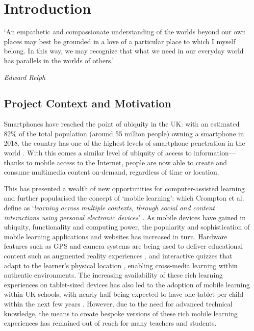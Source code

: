 \chapter{Introduction}

\epigraph{`An empathetic and compassionate understanding of the worlds beyond our own places may best be grounded in a love of a particular place to which I myself belong. In this way, we may recognize that what we need in our everyday world has parallels in the worlds of others.'}{\textit{Edward Relph}}

\section{Project Context and Motivation}

Smartphones have reached the point of ubiquity in the UK: with an estimated 82\% of the total population (around 55 million people) owning a smartphone in 2018, the country has one of the highest levels of smartphone penetration in the world \citep{wikipedia2020}. With this comes a similar level of ubiquity of access to information---thanks to mobile access to the Internet, people are now able to create and consume multimedia content on-demand, regardless of time or location.

This has presented a wealth of new opportunities for computer-assisted learning and further popularised the concept of `mobile learning': which Crompton et al. define as `\textit{learning across multiple contexts, through social and content interactions using personal electronic devices}' \citep{Crompton2013}. As mobile devices have gained in ubiquity, functionality and computing power, the popularity and sophistication of mobile learning applications and websites has increased in turn. Hardware features such as GPS and camera systems are being used to deliver educational content such as augmented reality experiences \citep{google2020}, and interactive quizzes that adapt to the learner's physical location \citep{Giemza2013}, enabling cross-media learning within authentic environments. The increasing availability of these rich learning experiences on tablet-sized devices has also led to the adoption of mobile learning within UK schools, with nearly half being expected to have one tablet per child within the next few years \citep{BritishEducationalSuppliersAssociation2015}. However, due to the need for advanced technical knowledge, the means to create bespoke versions of these rich mobile learning experiences has remained out of reach for many teachers and students.

